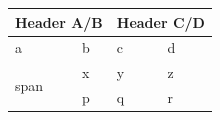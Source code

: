 \documentclass{article}
\begin{document}
\begin{tabular}{|l|l|l|l|}
  \hline
  \multicolumn{2}{|c|}{Header A/B} & \multicolumn{2}{c|}{Header C/D} \\
  \hline
  a & b & c & d \\
  \multirow{2}{*}{span} & x & y & z \\
   & p & q & r \\
  \hline
\end{tabular}
\end{document}

